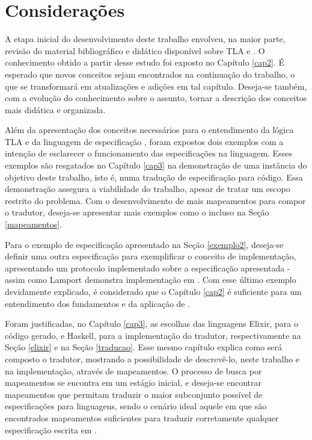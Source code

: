 \chapter{Considerações}

A etapa inicial do desenvolvimento deste trabalho envolveu, na maior parte, revisão do material bibliográfico e didático disponível sobre TLA e \TLAA. O conhecimento obtido a partir desse estudo foi exposto no Capítulo \ref{cap2}. É esperado que novos conceitos sejam encontrados na continuação do trabalho, o que se transformará em atualizações e adições em tal capítulo. Deseja-se também, com a evolução do conhecimento sobre o assunto, tornar a descrição dos conceitos mais didática e organizada.

Além da apresentação dos conceitos necessários para o entendimento da lógica TLA e da linguagem de especificação \TLAA, foram expostos dois exemplos com a intenção de esclarecer o funcionamento das especificações na linguagem. Esses exemplos são resgatados no Capítulo \ref{cap3} na demonstração de uma instância do objetivo deste trabalho, isto é, numa tradução de especificação para código. Essa demonstração assegura a viabilidade do trabalho, apesar de tratar um escopo restrito do problema. Com o desenvolvimento de mais mapeamentos para compor o tradutor, deseja-se apresentar mais exemplos como o incluso na Seção \ref{mapeamentos}.

Para o exemplo de especificação apresentado na Seção \ref{exemplo2}, deseja-se definir uma outra especificação para exemplificar o conceito de implementação, apresentando um protocolo implementado sobre a especificação apresentada - assim como Lamport demonstra implementação em \cite{video-protocol}. Com esse último exemplo devidamente explicado, é considerado que o Capítulo \ref{cap2} é suficiente para um entendimento dos fundamentos e da aplicação de \TLAA.

Foram justificadas, no Capítulo \ref{cap3}, as escolhas das linguagens Elixir, para o código gerado, e Haskell, para a implementação do tradutor, respectivamente na Seção \ref{elixir} e na Seção \ref{traducao}. Esse mesmo capítulo explica como será composto o tradutor, mostrando a possibilidade de descrevê-lo, neste trabalho e na implementação, através de mapeamentos. O processo de busca por mapeamentos se encontra em um estágio inicial, e deseja-se encontrar mapeamentos que permitam traduzir o maior subconjunto possível de especificações para linguagens, sendo o cenário ideal aquele em que são encontrados mapeamentos suficientes para traduzir corretamente qualquer especificação escrita em \TLAA.

